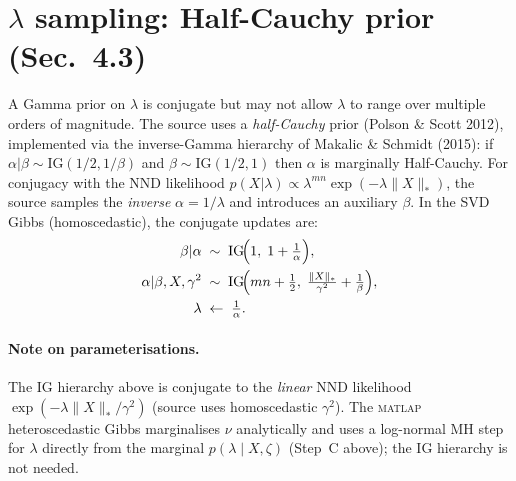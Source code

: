\documentclass[11pt]{article}
\begin{document}
\section*{$\lambda$ sampling: Half-Cauchy prior (Sec.\ 4.3)}
\label{sec:lambda}

A Gamma prior on $\lambda$ is conjugate but may not allow $\lambda$ to range
over multiple orders of magnitude.  The source uses a \emph{half-Cauchy}
prior (Polson \& Scott 2012), implemented via the inverse-Gamma hierarchy of
Makalic \& Schmidt (2015): if $\alpha|\beta\sim\mathrm{IG}(1/2, 1/\beta)$ and
$\beta\sim\mathrm{IG}(1/2,1)$ then $\alpha$ is marginally Half-Cauchy.  For
conjugacy with the NND likelihood $p(X|\lambda)\propto\lambda^{mn}\exp(-\lambda\|X\|_*)$,
the source samples the \emph{inverse} $\alpha=1/\lambda$ and introduces an
auxiliary $\beta$.  In the SVD Gibbs (homoscedastic), the conjugate updates are:
\begin{align}
  \beta|\alpha &\;\sim\; \mathrm{IG}\!\Bigl(1,\; 1 + \tfrac{1}{\alpha}\Bigr), \\
  \alpha|\beta,X,\gamma^2 &\;\sim\;
  \mathrm{IG}\!\Bigl(mn + \tfrac{1}{2},\;
    \tfrac{\|X\|_*}{\gamma^2} + \tfrac{1}{\beta}\Bigr), \\
  \lambda &\;\leftarrow\; \tfrac{1}{\alpha}.
\end{align}

\paragraph{Note on parameterisations.}
The IG hierarchy above is conjugate to the \emph{linear} NND likelihood
$\exp(-\lambda\|X\|_*/\gamma^2)$ (source uses homoscedastic $\gamma^2$).
The \textsc{matlap} heteroscedastic Gibbs marginalises $\nu$ analytically and
uses a log-normal MH step for $\lambda$ directly from the marginal
$p(\lambda\mid X,\zeta)$ (Step~C above); the IG hierarchy is not needed.
\end{document}
